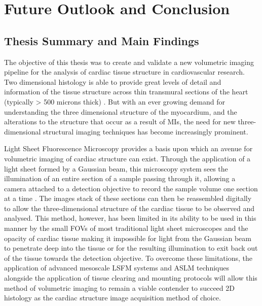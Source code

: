 \chapter{Future Outlook and Conclusion}

\section{Thesis Summary and Main Findings}
The objective of this thesis was to create and validate a new volumetric imaging pipeline for the analysis of cardiac tissue structure in cardiovascular research. Two dimensional histology is able to provide great levels of detail and information of the tissue structure across thin transmural sections of the heart (typically > 500 microns thick) \cite{watson_myocardial_2019}. But with an ever growing demand for understanding the three dimensional structure of the myocardium, and the alterations to the structure that occur as a result of MIs, the need for new three-dimensional structural imaging techniques has become increasingly prominent. 

Light Sheet Fluorescence Microscopy provides a basis upon which an avenue for volumetric imaging of cardiac structure can exist. Through the application of a light sheet formed by a Gaussian beam, this microscopy system sees the illumination of an entire section of a sample passing through it, allowing a camera attached to a detection objective to record the sample volume one section at a time \cite{voigt_mesospim_2019}. The images stack of these sections can then be reassembled digitally to allow the three-dimensional structure of the cardiac tissue to be observed and analysed. This method, however, has been limited in its ability to be used in this manner by the small FOVs of most traditional light sheet microscopes and the opacity of cardiac tissue making it impossible for light from the Gaussian beam to penetrate deep into the tissue or for the resulting illumination to exit back out of the tissue towards the detection objective. To overcome these limitations, the application of advanced mesoscale LSFM systems and ASLM techniques alongside the application of tissue clearing and mounting protocols will allow this method of volumetric imaging to remain a viable contender to succeed 2D histology as the cardiac structure image acquisition method of choice.  


